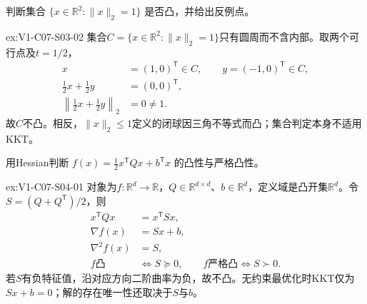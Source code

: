 \begin{SLChapterExercisePairSection}
\begin{exercise}\label{ex:V1-C07-S03-02}
判断集合 $\{x\in\mathbb R^2:\|x\|_2=1\}$ 是否凸，并给出反例点。
\end{exercise}
\label{sol:V1-C07-S03-02}
\begin{chapterexercisesolution}{ex:V1-C07-S03-02}
集合$C=\{x\in\mathbb R^2:\|x\|_2=1\}$只有圆周而不含内部。取两个可行点及$t=1/2$，
\[
\begin{aligned}
x&=(1,0)^{\mathsf T}\in C,\qquad
y=(-1,0)^{\mathsf T}\in C,\\
\frac12x+\frac12y&=(0,0)^{\mathsf T},\\
\left\|\frac12x+\frac12y\right\|_2&=0\ne1.
\end{aligned}
\]
故$C$不凸。相反，$\|x\|_2\le1$定义的闭球因三角不等式而凸；集合判定本身不适用KKT。
\end{chapterexercisesolution}

\begin{exercise}\label{ex:V1-C07-S04-01}
用Hessian判断 $f(x)=\tfrac12x^{\mathsf T}Qx+b^{\mathsf T}x$ 的凸性与严格凸性。
\end{exercise}
\label{sol:V1-C07-S04-01}
\begin{chapterexercisesolution}{ex:V1-C07-S04-01}
对象为$f:\mathbb R^d\to\mathbb R$，$Q\in\mathbb R^{d\times d}$、$b\in\mathbb R^d$，定义域是凸开集$\mathbb R^d$。令$S=(Q+Q^{\mathsf T})/2$，则
\[
\begin{aligned}
x^{\mathsf T}Qx&=x^{\mathsf T}Sx,\\
\nabla f(x)&=Sx+b,\\
\nabla^2f(x)&=S,\\
f\text{凸}&\Longleftrightarrow S\succeq0,\qquad
f\text{严格凸}\Longleftrightarrow S\succ0.
\end{aligned}
\]
若$S$有负特征值，沿对应方向二阶曲率为负，故不凸。无约束最优化时KKT仅为$Sx+b=0$；解的存在唯一性还取决于$S$与$b$。
\end{chapterexercisesolution}


\end{SLChapterExercisePairSection}
